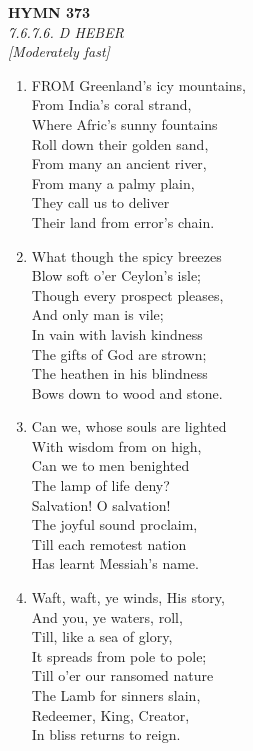 \newpage
\begin{center}
    {\Large \textbf{HYMN 373}}
    \\
    \textit{7.6.7.6. D HEBER}
    \\
    \textit{\small [Moderately fast]}
\end{center}
\vspace{1em}

\begin{enumerate}
    \item FROM Greenland's icy mountains, \\
        From India's coral strand, \\
        Where Afric's sunny fountains \\
        Roll down their golden sand, \\
        From many an ancient river, \\
        From many a palmy plain, \\
        They call us to deliver \\
        Their land from error's chain.

    \item What though the spicy breezes \\
        Blow soft o'er Ceylon's isle; \\
        Though every prospect pleases, \\
        And only man is vile; \\
        In vain with lavish kindness \\
        The gifts of God are strown; \\
        The heathen in his blindness \\
        Bows down to wood and stone.

    \item Can we, whose souls are lighted \\
        With wisdom from on high, \\
        Can we to men benighted \\
        The lamp of life deny? \\
        Salvation! O salvation! \\
        The joyful sound proclaim, \\
        Till each remotest nation \\
        Has learnt Messiah's name.

    \item Waft, waft, ye winds, His story, \\
        And you, ye waters, roll, \\
        Till, like a sea of glory, \\
        It spreads from pole to pole; \\
        Till o'er our ransomed nature \\
        The Lamb for sinners slain, \\
        Redeemer, King, Creator, \\
        In bliss returns to reign.

\end{enumerate}

